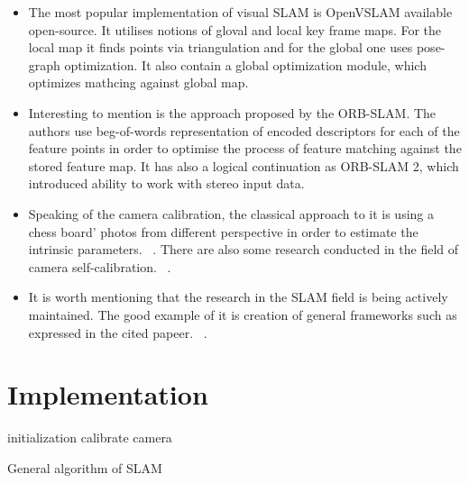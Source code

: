 \begin{itemize}
    \item The most popular implementation of visual SLAM is OpenVSLAM available open-source. It utilises notions of gloval and local key frame maps. For the local map it finds points via triangulation and for the global one uses pose-graph optimization. It also contain a global optimization module, which optimizes mathcing against global map. ~\cite{OpenVSLAM}
    \item Interesting to mention is the approach proposed by the ORB-SLAM. The authors use beg-of-words representation of encoded descriptors for each of the feature points in order to optimise the process of feature matching against the stored feature map. It has also a logical continuation as ORB-SLAM 2, which introduced ability to work with stereo input data. ~\cite{ORB_SLAM}
    \item Speaking of the camera calibration, the classical approach to it is using a chess board' photos from different perspective in order to estimate the intrinsic parameters. ~\cite{Camera_Calibration}. There are also some research conducted in the field of camera self-calibration. ~\cite{Self_Calibration}.
    \item It is worth mentioning that the research in the SLAM field is being actively maintained. The good example of it is creation of general frameworks such as expressed in the cited papeer. ~\cite{GeneralFramework}.
\end{itemize}

\section{Implementation}

\begin{algorithm}[H]

	initialization\;
	calibrate camera\;
	\caption{General algorithm of SLAM}
\end{algorithm}

\vskip 1cm

